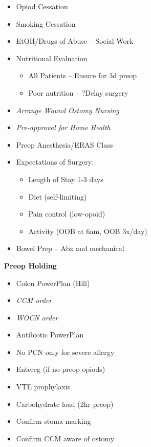 \documentclass[
]{book}
\providecommand{\tightlist}{%
  \setlength{\itemsep}{0pt}\setlength{\parskip}{0pt}}
\begin{document}
\begin{itemize}
\tightlist
\item
  Opiod Cessation
\item
  Smoking Cessation
\item
  EtOH/Drugs of Abuse -- Social Work
\item
  Nutritional Evaluation

  \begin{itemize}
  \tightlist
  \item
    All Patients -- Ensure for 3d preop
  \item
    Poor nutrition -- ?Delay surgery
  \end{itemize}
\item
  \emph{Arrange Wound Ostomy Nursing}
\item
  \emph{Pre-approval for Home Health}
\item
  Preop Anesthesia/ERAS Class
\item
  Expectations of Surgery:

  \begin{itemize}
  \tightlist
  \item
    Length of Stay 1-3 days
  \item
    Diet (self-limiting)
  \item
    Pain control (low-opoid)
  \item
    Activity (OOB at 6am, OOB 3x/day)
  \end{itemize}
\item
  Bowel Prep -- Abx and mechanical
\end{itemize}

\textbf{Preop Holding}

\begin{itemize}
\tightlist
\item
  Colon PowerPlan (Hill)
\item
  \emph{CCM order}
\item
  \emph{WOCN order}
\item
  Antibiotic PowerPlan
\item
  No PCN only for severe allergy
\item
  Entereg (if no preop opiods)
\item
  VTE prophylaxis
\item
  Carbohydrate load (2hr preop)
\item
  Confirm stoma marking
\item
  Confirm CCM aware of ostomy
\end{itemize}
\end{document}
